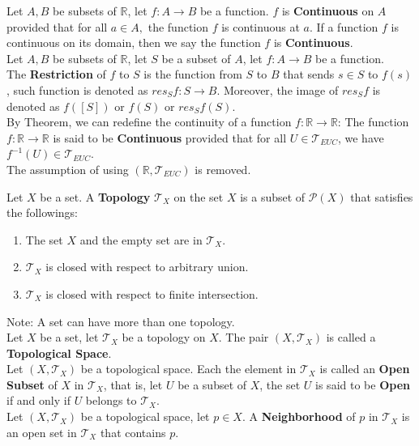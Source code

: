 \documentclass[11pt]{article}
\newcommand{\R}{\mathbb{R}}
\newcommand{\T}{\mathcal{T}}
\newcommand{\Power}{\mathcal{P}}
\newcommand{\note}{\color{gray}Note: \color{black}}
\begin{document}
		\noindent Let $A,B$ be subsets of $\R$, let $f: A \to B$ be a function. $f$ is \textbf{Continuous} on $A$ provided that for all $a \in A,$ the function $f$ is continuous at $a$. If a function $f$ is continuous on its domain, then we say the function $f$ is \textbf{Continuous}.\\

		\noindent Let $A,B$ be subsets of $\R$, let $S$ be a subset of $A$, let $f:A \to B$ be a function.\\ The \textbf{Restriction} of $f$ to $S$ is the function from $S$ to $B$ that sends $s \in S$ to $f(s)$, such function is denoted as $res_S f:S \to B$. Moreover, the image of $res_S f$ is denoted as $f([S])$ or $f(S)$ or $res_S f(S)$.\\
		
		\noindent By Theorem, we can redefine the continuity of a function $f:\R \to \R$: The function $f:\R \to \R$ is said to be \textbf{Continuous} provided that for all $U \in \T_{EUC}$, we have $f^{-1}(U) \in \T_{EUC}$.\\
		
		\noindent \color{red} The assumption of using $(\R,\T_{EUC})$ is removed. \color{black}
	\clearpage

		\noindent  Let $X$ be a set. A \textbf{Topology} $\T_X$ on the set $X$ is a subset of $\Power (X)$ that satisfies the followings:
		\begin{enumerate}[topsep=3pt,itemsep=-1ex,partopsep=1ex,parsep=1ex]
			\item The set $X$ and the empty set are in $\T_X$.
			\item $\T_X$ is closed with respect to arbitrary union.
			\item $\T_X$ is closed with respect to finite intersection.
		\end{enumerate}
		\note A set can have more than one topology.\\
		
		\noindent Let $X$ be a set, let $\T_X$ be a topology on $X$. The pair $(X, \T_X)$ is called a \textbf{Topological Space}.\\
		
		\noindent Let $(X,\T_X)$ be a topological space. Each the element in $\T_X$ is called an \textbf{Open Subset} of $X$ in $\T_X$, that is, let $U$ be a subset of $X$, the set $U$ is said to be \textbf{Open} if and only if $U$ belongs to $\T_X$.\\
		
		\noindent Let $(X,\T_X)$ be a topological space, let $p \in X$. A \textbf{Neighborhood} of $p$ in $\T_X$ is an open set in $\T_X$ that contains $p$.\\
		
\end{document}
